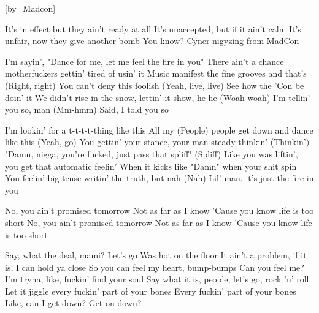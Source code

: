 


[by=Madcon]

\beginverse*
{\nolyrics Jam chart (approx.): \[Am] \[F] \[C] \[G] \quad (Loop)}
\endverse

\beginverse
It's in effect but they ain't ready at all \brk
It's unaccepted, but if it ain't calm \brk
It's unfair, now they give another bomb \brk
You know? Cyner-nigyzing from MadCon
\endverse

\beginverse
I'm sayin', "Dance for me, let me feel the fire in you" \brk
There ain't a chance motherfuckers gettin' tired of usin' it \brk
Music manifest the fine grooves and that's (Right, right) \brk
You can't deny this foolish (Yeah, live, live) \brk
See how the 'Con be doin' it \brk
We didn't rise in the snow, lettin' it show, he-he (Woah-woah) \brk
I'm tellin' you so, man (Mm-hmm) \brk
Said, I told you so
\endverse

\beginverse
I'm lookin' for a t-t-t-t-thing like this \brk
All my (People) people get down and dance like this (Yeah, go) \brk
You gettin' your stance, your man steady thinkin' (Thinkin') \brk
"Damn, nigga, you're fucked, just pass that spliff" (Spliff) \brk
Like you was liftin', you get that automatic feelin' \brk
When it kicks like "Damn" when your shit spin \brk
You feelin' big tense writin' the truth, but nah (Nah) \brk
Lil' man, it's just the fire in you
\endverse

\beginchorus
No, you ain't promised tomorrow \brk  Not as far as I know
'Cause you know life is too short
No, you ain't promised tomorrow \brk  Not as far as I know
'Cause you know life is too short
\endchorus

\beginverse
Say, what the deal, mami? Let's go \brk
Was hot on the floor
It ain't a problem, if it is, I can hold ya close \brk
So you can feel my heart, bump-bumps \brk
Can you feel me? I'm tryna, like, fuckin' find your soul \brk
Say what it is, people, let's go, rock 'n' roll \brk
Let it jiggle every fuckin' part of your bones \brk
Every fuckin' part of your bones \brk
Like, can I get down? Get on down?
\endverse

